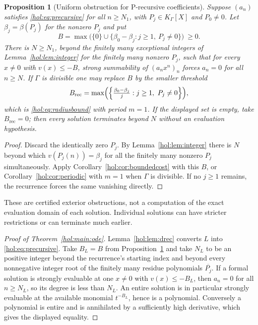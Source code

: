 \documentclass[11pt]{article}
\numberwithin{equation}{section}
\newtheorem{proposition}[theorem]{Proposition}
\theoremstyle{definition}
\theoremstyle{remark}
\newcommand{\K}{K_\Gamma}
\begin{document}
\begin{proposition}[Uniform obstruction for P-recursive coefficients]
\label{hol:prop:precursive}
Suppose $(a_n)$ satisfies \eqref{hol:eq:precursive} for all $n\ge N_1$, with
$P_j\in\K[X]$ and $P_0\ne0$. Let $\beta_j=\beta(P_j)$ for the nonzero $P_j$
and put
\[
 B=\max\bigl(\{0\}\cup\{\beta_0-\beta_j:j\ge1,\ P_j\ne0\}\bigr)\ \ge0.
\]
There is $N\ge N_1$, beyond the finitely many exceptional integers of
Lemma~\ref{hol:lem:integer} for the finitely many nonzero $P_j$, such that for
every $x\ne0$ with $v(x)\le-B$, strong summability of $(a_nx^n)_n$ forces
$a_n=0$ for all $n\ge N$. If $\Gamma$ is divisible one may replace $B$ by the
smaller threshold
\begin{equation}\label{hol:eq:refinedthreshold}
 B_{\mathrm{rec}}
 =\max\Bigl(\Bigl\{\tfrac{\beta_0-\beta_j}{j}:j\ge1,\ P_j\ne0\Bigr\}\Bigr),
\end{equation}
which is \eqref{hol:eq:radiusbound} with period $m=1$.
If the displayed set is empty, take $B_{\mathrm{rec}}=0$; then every
solution terminates beyond $N$ without an evaluation hypothesis.
\end{proposition}

\begin{proof}
Discard the identically zero $P_j$. By Lemma~\ref{hol:lem:integer} there is
$N$ beyond which $v(P_j(n))=\beta_j$ for all the finitely many nonzero $P_j$
simultaneously. Apply Corollary~\ref{hol:cor:boundedcost} with this $B$, or
Corollary~\ref{hol:cor:periodic} with $m=1$ when $\Gamma$ is divisible. If no
$j\ge1$ remains, the recurrence forces the same vanishing directly.
\end{proof}

These are certified exterior obstructions, not a computation of the exact
evaluation domain of each solution. Individual solutions can have stricter
restrictions or can terminate much earlier.

\begin{proof}[Proof of Theorem~\ref{hol:main:ode}]
Lemma~\ref{hol:lem:drec} converts $L$ into \eqref{hol:eq:precursive}. Take
$B_L=B$ from Proposition~\ref{hol:prop:precursive} and take $N_L$ to be an
positive integer beyond the recurrence's starting index and beyond every nonnegative
integer root of the finitely many residue polynomials $\overline{P_j}$. If a
formal solution is strongly evaluable at one $x\ne0$ with $v(x)\le-B_L$, then
$a_n=0$ for all $n\ge N_L$, so its degree is less than $N_L$. An entire
solution is in particular strongly evaluable at the available monomial
$t^{-B_L}$, hence is a polynomial. Conversely a polynomial is entire and is
annihilated by a sufficiently high derivative, which gives the displayed
equality.
\end{proof}
\end{document}
